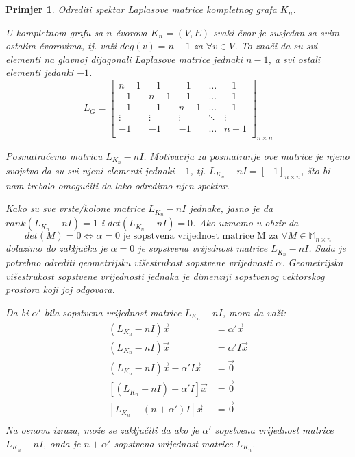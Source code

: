 \documentclass[11pt]{article}
\newtheorem{example}{Primjer}
\begin{document}
	\begin{example}{Odrediti spektar Laplasove matrice kompletnog grafa $K_n$}.

	U kompletnom grafu sa $n$ čvorova $K_n =(V,E)$ svaki čvor je susjedan sa svim ostalim čvorovima, 
	tj. važi $deg(v)=n-1$ za $\forall v \in V$. To znači da su svi elementi na glavnoj dijagonali Laplasove matrice jednaki $n-1$,
	a svi ostali elementi jedanki $-1$.
	\[
	L_G =
	\begin{bmatrix}
	n-1 & -1 & -1 & \dots & -1 \\
	-1 & n-1 & -1 & \dots & -1 \\
	-1 & -1 & n-1 & \dots & -1 \\
	\vdots & \vdots & \vdots & \ddots & \vdots \\
	-1 & -1 & -1 & \dots & n-1 \\
	\end{bmatrix}_{n \times n}
	\]
	
	Posmatraćemo matricu $L_{K_n} - nI$. Motivacija za posmatranje ove matrice je njeno svojstvo da su svi njeni elementi jednaki $-1$, tj. $L_{K_n} - nI = [-1]_{n \times n}$,
	što bi nam trebalo omogućiti da lako odredimo njen spektar.
	
	Kako su sve vrste/kolone matrice $L_{K_n} - nI$ jednake, jasno je da $rank(L_{K_n} - nI) = 1$ i $det(L_{K_n} - nI) = 0$. 
	Ako uzmemo u obzir da 
	\[
	det(M) = 0 \Leftrightarrow \alpha = 0 \text{ je sopstvena vrijednost matrice M za } \forall M \in \mathbb{M}_{n \times n}
	\]
	dolazimo do zaključka je $\alpha = 0$ je sopstvena vrijednost matrice $L_{K_n} - nI$. 
	Sada je potrebno odrediti geometrijsku višestrukost sopstvene vrijednosti $\alpha$. Geometrijska višestrukost sopstvene vrijednosti jednaka je dimenziji sopstvenog vektorskog prostora koji joj odgovara.
	
	Da bi $\alpha'$ bila sopstvena vrijednost matrice $L_{K_n} - nI$, mora da važi:
	\[
	\begin{split}
	(L_{K_n} - nI)\vec{x} &= \alpha' \vec{x} \\
	(L_{K_n} - nI)\vec{x} &= \alpha' I \vec{x} \\
	(L_{K_n} - nI)\vec{x} - \alpha' I \vec{x} &= \vec{0}  \\
	[(L_{K_n} - nI) - \alpha' I] \vec{x} &= \vec{0}  \\
	[L_{K_n} - (n + \alpha') I] \vec{x} &= \vec{0}  \\
	\end{split}
	\]
	Na osnovu izraza, može se zaključiti da ako je $\alpha'$ sopstvena vrijednost matrice $L_{K_n} - nI$, onda je $n + \alpha'$ sopstvena vrijednost matrice $L_{K_n}$.


\end{example}
\end{document}
